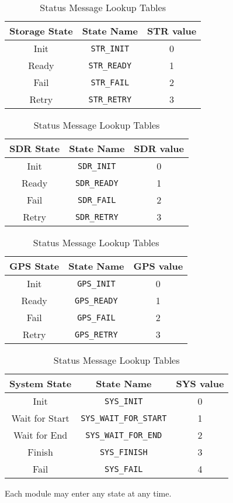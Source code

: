 \documentclass{report}
\begin{document}
				\begin{table}[htp]
					\centering
					\caption{Status Message Lookup Tables}
					\label{tbl:obc_status_vals}
					\begin{tabular}{c|c|c}
						Storage State & State Name & STR value \\\hline
						Init & \lstinline!STR_INIT! & 0\\
						Ready & \lstinline!STR_READY! & 1\\
						Fail & \lstinline!STR_FAIL! & 2\\
						Retry & \lstinline!STR_RETRY! & 3
					\end{tabular}
					
					\begin{tabular}{c|c|c}
						SDR State & State Name & SDR value \\\hline
						Init & \lstinline!SDR_INIT! & 0\\
						Ready & \lstinline!SDR_READY! & 1\\
						Fail & \lstinline!SDR_FAIL! & 2\\
						Retry & \lstinline!SDR_RETRY! & 3
					\end{tabular}
					
					\begin{tabular}{c|c|c}
						GPS State & State Name & GPS value\\\hline
						Init & \lstinline!GPS_INIT! & 0\\
						Ready & \lstinline!GPS_READY! & 1\\
						Fail & \lstinline!GPS_FAIL! & 2\\
						Retry & \lstinline!GPS_RETRY! & 3
					\end{tabular}
					
					\begin{tabular}{c|c|c}
						System State & State Name & SYS value\\\hline
						Init & \lstinline!SYS_INIT! & 0\\
						Wait for Start & \lstinline!SYS_WAIT_FOR_START! & 1\\
						Wait for End & \lstinline!SYS_WAIT_FOR_END! & 2\\
						Finish & \lstinline!SYS_FINISH! & 3\\
						Fail & \lstinline!SYS_FAIL! & 4
					\end{tabular}
				\end{table}

				Each module may enter any state at any time.
\end{document}
